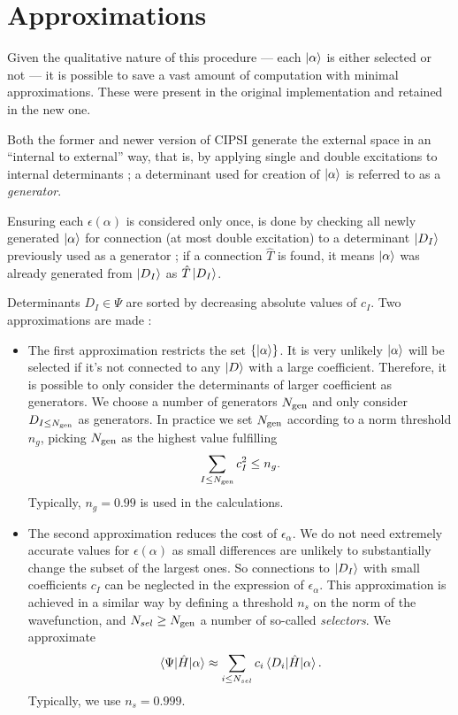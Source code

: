 \documentclass[./thesis.tex]{subfiles}
\begin{document}
\section{Approximations}

Given the qualitative nature of this procedure --- each ${\ket{\alpha}}$ is either selected or not --- it is possible to save a vast amount of computation with minimal approximations. These were present in the original implementation and retained in the new one.

Both the former and newer version of CIPSI generate the external space in an ``internal to external'' way, that is, by applying single and double excitations to internal determinants ; a determinant used for creation of ${\ket{\alpha}}$ is referred to as a \emph{generator}.

Ensuring each $\epsilon(\alpha)$ is considered only once, is done by checking all newly generated ${\ket{\alpha}}$ for connection (at most double excitation) to a determinant $\ket {D_I}$ previously used as a generator ; if a connection $\hat T$ is found, it means ${\ket{\alpha}}$ was already generated from $\ket {D_I}$ as $\hat T \ket {D_I}$.

Determinants $D_I \in \Psi$ are sorted by decreasing absolute values of $c_I$. Two approximations are made :

\begin{itemize}
\item
The first approximation restricts the set $\{{\ket{\alpha}}\}$. It is very unlikely $\ket \alpha$ will be selected if it's not connected to any $\ket D$ with a large coefficient. Therefore, it is possible to only consider the determinants of larger coefficient as generators. We choose a number of generators ${N_\text{gen}}$ and only consider $D_{I \leq {N_\text{gen}}}$ as generators. In practice we set ${N_\text{gen}}$ according to a norm threshold $n_g$, picking ${N_\text{gen}}$ as the highest value fulfilling
\begin{equation}
\sum_{I \leq {N_\text{gen}}} c_I^2 \leq n_g.
\end{equation}
Typically, $n_g=0.99$ is used in the calculations.
\item The second approximation reduces the cost of $\epsilon_\alpha$.
We do not need extremely accurate values for $\epsilon(\alpha)$ as small differences are unlikely to substantially change the subset of the largest ones.
So  connections to $\ket {D_I}$ with small coefficients $c_I$ can be neglected
in the expression of $\epsilon_\alpha$.
This approximation is achieved in a similar way by defining a threshold $n_s$
on the norm of the wavefunction, and $N_{sel} \geq {N_\text{gen}}$ a number of so-called
\emph{selectors}. We approximate 
\begin{equation}
  \mel{\Psi}{\hat{H}}{\alpha} \approx \sum_{i \leq N_{sel}} c_i \mel{D_i}{\hat{H}}{\alpha}.
\end{equation}
Typically, we use $n_s = 0.999$.

\end{itemize}
\end{document}
